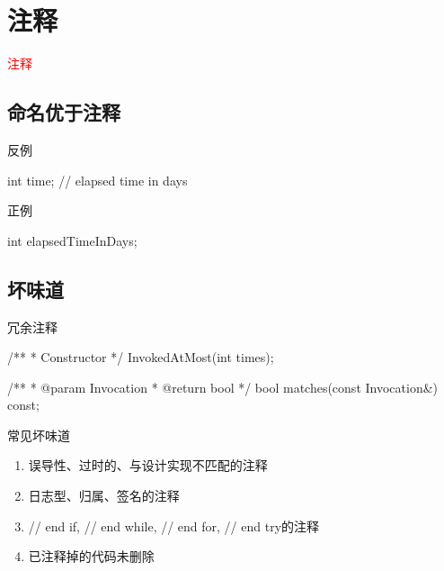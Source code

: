 \section{注释}
\label{sec:comment}

\begin{frame}
  \begin{center}
    \Huge{\textcolor{red}{注释}}
  \end{center}
\end{frame}

\subsection{命名优于注释}

\begin{frame}[fragile]{反例}
  \begin{c++}
int time; // elapsed time in days  
  \end{c++}
\end{frame}

\begin{frame}[fragile]{正例}
  \begin{c++}
int elapsedTimeInDays;
  \end{c++}
\end{frame}

\subsection{坏味道}

\begin{frame}[fragile]{冗余注释}
\begin{c++}
/**
 * Constructor
 */
InvokedAtMost(int times);

/**
 * @param Invocation
 * @return bool
 */
bool matches(const Invocation&) const;
\end{c++}
\end{frame}

\begin{frame}[fragile]{常见坏味道}
\begin{enumerate}
  \item 误导性、过时的、与设计实现不匹配的注释
  \item 日志型、归属、签名的注释
  \item // end if, // end while, // end for, // end try的注释
  \item 已注释掉的代码未删除
\end{enumerate}
\end{frame}

